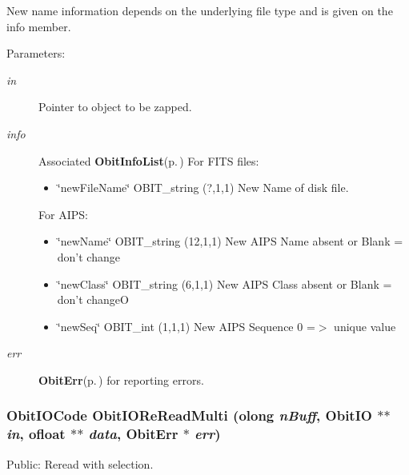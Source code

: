 New name information depends on the underlying file type and is given on the info member. \begin{Desc}
\item[Parameters:]
\begin{description}
\item[{\em in}]Pointer to object to be zapped. \item[{\em info}]Associated {\bf Obit\-Info\-List}{\rm (p.\,\pageref{structObitInfoList})} For FITS files: \begin{itemize}
\item \char`\"{}new\-File\-Name\char`\"{} OBIT\_\-string (?,1,1) New Name of disk file.\end{itemize}
For AIPS: \begin{itemize}
\item \char`\"{}new\-Name\char`\"{} OBIT\_\-string (12,1,1) New AIPS Name absent or Blank = don't change \item \char`\"{}new\-Class\char`\"{} OBIT\_\-string (6,1,1) New AIPS Class absent or Blank = don't change\-O \item \char`\"{}new\-Seq\char`\"{} OBIT\_\-int (1,1,1) New AIPS Sequence 0 =$>$ unique value \end{itemize}
\item[{\em err}]{\bf Obit\-Err}{\rm (p.\,\pageref{structObitErr})} for reporting errors. \end{description}
\end{Desc}
\subsubsection{\setlength{\rightskip}{0pt plus 5cm}Obit\-IOCode Obit\-IORe\-Read\-Multi ({\bf olong} {\em n\-Buff}, {\bf Obit\-IO} $\ast$$\ast$ {\em in}, {\bf ofloat} $\ast$$\ast$ {\em data}, {\bf Obit\-Err} $\ast$ {\em err})}\label{ObitIO_8h_a43}


Public: Reread with selection. 

